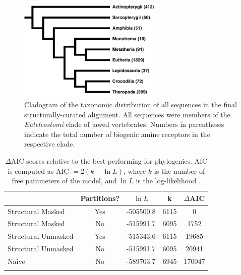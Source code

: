 \documentclass[fleqn,10pt]{wlpeerj}
\begin{document}
\newpage


\begin{figure}[htbp]
	\centerline{\includegraphics[width=7cm]{figures/taxonomic_distribution.pdf}}
	\caption{\label{taxa_dist} Cladogram of the taxonomic distribution of all sequences in the final structurally-curated alignment. All sequences were members of the \emph{Euteleostomi} clade of jawed vertebrates. Numbers in parentheses indicate the total number of biogenic amine receptors in the respective clade.}
\end{figure}

\vspace{3cm}

\begin{table}[htbp]
	\centering
	\begin{tabular}{l c l l c}
		\hline\noalign{\smallskip}
		\multicolumn{1}{c}{Alignment} & \multicolumn{1}{c}{Partitions?} & \multicolumn{1}{c}{$\ln L$} & \multicolumn{1}{c}{k} & \multicolumn{1}{l}{$\Delta$AIC} \\
		\hline\noalign{\smallskip}
		Structural Masked & Yes & -505500.8 & 6115 & 0 \\
		Structural Masked & No & -515991.7 & 6095 & 1752 \\  
		Structural Unmasked & Yes & -515343.6 & 6115 & 19685 \\
		Structural Unmasked & No & -515991.7 & 6095 & 20941 \\ 
		Naive & No &  -589703.7 & 6945 & 170047 \\
		\noalign{\smallskip}\hline\noalign{\smallskip} 
	\end{tabular}
	\caption{\label{tab:phylo_AIC} $\Delta$AIC scores relative to the best performing for phylogenies.  AIC is computed as AIC $= 2(k - \ln L)$, where $k$ is the number of free parameters of the model, and $\ln L$ is the log-likelihood \citep{Akaike1974,BurnhamAnderson2004}.}
\end{table}


\newpage
\end{document}
